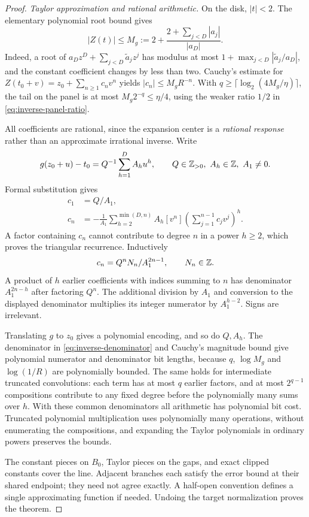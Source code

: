 \begin{proof}
\emph{Taylor approximation and rational arithmetic.}
On the disk, $|t|<2$. The elementary polynomial root bound gives
\[
 |Z(t)|\le M_g:=2+\frac{2+\sum_{j<D}|a_j|}{|a_D|}.
\]
Indeed, a root of $a_Dz^D+\sum_{j<D}\widetilde a_jz^j$ has
modulus at most $1+\max_{j<D}|\widetilde a_j/a_D|$, and the
constant coefficient changes by less than two. Cauchy's estimate for
$Z(t_0+v)=z_0+\sum_{n\ge1}c_nv^n$ yields
$|c_n|\le M_gR^{-n}$. With
$q\ge\lceil\log_2(4M_g/\eta)\rceil$, the tail on the panel is
at most $M_g2^{-q}\le\eta/4$, using the weaker ratio $1/2$ in
\eqref{eq:inverse-panel-ratio}.

All coefficients are rational, since the expansion center is a
\emph{rational response} rather than an approximate irrational inverse.
Write
\[
 g(z_0+u)-t_0=Q^{-1}\sum_{h=1}^D A_hu^h,
 \qquad Q\in\mathbb Z_{>0},\ A_h\in\mathbb Z,\ A_1\ne0.
\]
Formal substitution gives
\begin{equation}\label{eq:inverse-reversion}
 \begin{split}
 c_1&=Q/A_1,\\
 c_n&=-\frac1{A_1}\sum_{h=2}^{\min(D,n)}A_h[v^n]
                       \left(\sum_{j=1}^{n-1}c_jv^j\right)^h.
 \end{split}
\end{equation}
A factor containing $c_n$ cannot contribute to degree $n$ in a power
$h\ge2$, which proves the triangular recurrence. Inductively
\begin{equation}\label{eq:inverse-denominator}
                    c_n=Q^nN_n/A_1^{2n-1},\qquad N_n\in\mathbb Z.
\end{equation}
A product of $h$ earlier coefficients with indices summing to $n$
has denominator $A_1^{2n-h}$ after factoring $Q^n$. The additional
division by $A_1$ and conversion to the displayed denominator multiplies
its integer numerator by $A_1^{h-2}$. Signs are irrelevant.

Translating $g$ to $z_0$ gives a polynomial encoding, and so do $Q,A_h$.
The denominator in \eqref{eq:inverse-denominator} and Cauchy's magnitude
bound give polynomial numerator and denominator bit lengths, because
$q$, $\log M_g$ and $\log(1/R)$ are polynomially bounded. The same
holds for intermediate truncated convolutions: each term has at most
$q$ earlier factors, and at most $2^{q-1}$ compositions contribute to
any fixed degree before the polynomially many sums over $h$.
With these common denominators all arithmetic has polynomial bit cost.
Truncated polynomial multiplication uses polynomially many operations,
without enumerating the compositions, and expanding the Taylor polynomials
in ordinary powers preserves the bounds.

The constant pieces on $B_0$, Taylor pieces on the gaps, and exact
clipped constants cover the line. Adjacent branches each satisfy the
error bound at their shared endpoint; they need not agree exactly.
A half-open convention defines a single approximating function if needed.
Undoing the target normalization proves the theorem.
\end{proof}

